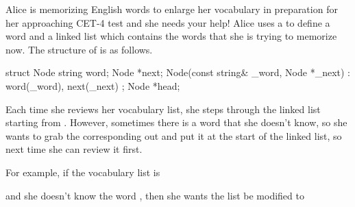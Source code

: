 
Alice is memorizing English words to enlarge her vocabulary in preparation for her approaching CET-4 test and she needs your help! Alice uses a  to define a word and a linked list which contains the words that she is trying to memorize now. The structure of  is as follows.

\begin{cpp}
    struct Node {
      string word;
      Node *next;
      Node(const string& _word, Node *_next)
    	  : word(_word), next(_next) {}
    };
    Node *head;
\end{cpp}

Each time she reviews her vocabulary list, she steps through the linked list starting from . However, sometimes there is a word that she doesn't know, so she wants to grab the corresponding  out and put it at the start of the linked list, so next time she can review it first.

For example, if the vocabulary list is 
\begin{center}
\end{center}
and she doesn't know the word , then she wants the list be modified to
\begin{center}
\end{center}

